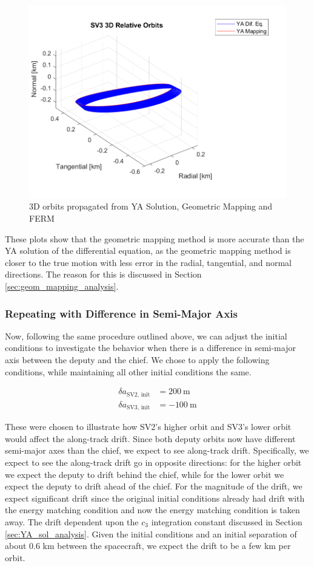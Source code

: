 \begin{figure}[H]
    \centering
    \includegraphics[width=0.7\linewidth]{sim/figures/PS3/3D_YA_comparison.png}
    \caption{3D orbits propagated from YA Solution, Geometric Mapping and FERM}
    \label{fig:3D_orbits_comp}
\end{figure}

These plots show that the geometric mapping method is more accurate than the YA solution of the differential equation, as the geometric mapping method is closer to the true motion with less error in the radial, tangential, and normal directions. The reason for this is discussed in Section \ref{sec:geom_mapping_analysis}. 

\subsubsection{Repeating with Difference in Semi-Major Axis}
Now, following the same procedure outlined above, we can adjust the initial conditions to investigate the behavior when there is a difference in semi-major axis between the deputy and the chief. We chose to apply the following conditions, while maintaining all other initial conditions the same. 

\begin{align*}
\delta a_{\text{SV2, init}} &= 200 \ \text{m} \\
\delta a_{\text{SV3, init}} &= -100 \ \text{m}
\end{align*}

These were chosen to illustrate how SV2's higher orbit and SV3's lower orbit would affect the along-track drift. Since both deputy orbits now have different semi-major axes than the chief, we expect to see along-track drift. Specifically, we expect to see the along-track drift go in opposite directions: for the higher orbit we expect the deputy to drift behind the chief, while for the lower orbit we expect the deputy to drift ahead of the chief. For the magnitude of the drift, we expect significant drift since the original initial conditions already had drift with the energy matching condition and now the energy matching condition is taken away. The drift dependent upon the $c_3$ integration constant discussed in Section \ref{sec:YA_sol_analysis}. Given the initial conditions and an initial separation of about 0.6 km between the spacecraft, we expect the drift to be a few km per orbit. 

